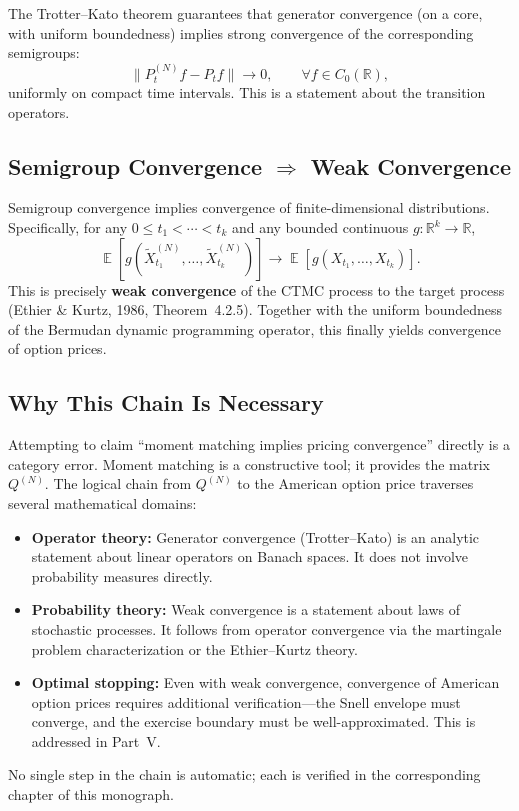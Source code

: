 \documentclass[11pt,a4paper,openany]{book}
\theoremstyle{definition}
\theoremstyle{plain}
\theoremstyle{remark}
\DeclareMathOperator{\E}{\mathbb{E}}
\newcommand{\1}{\mathbbm{1}}
\newcommand{\R}{\mathbb{R}}
\begin{document}
The Trotter--Kato theorem guarantees that generator convergence (on a core, with uniform boundedness) implies strong convergence of the corresponding semigroups:
\[
\|P_{t}^{(N)} f - P_{t} f\| \to 0, \qquad \forall f \in C_{0}(\R),
\]
uniformly on compact time intervals. This is a statement about the transition operators.

\subsection{Semigroup Convergence $\Rightarrow$ Weak Convergence}

Semigroup convergence implies convergence of finite-dimensional distributions. Specifically, for any $0 \leq t_{1} < \cdots < t_{k}$ and any bounded continuous $g: \R^{k} \to \R$,
\[
\E[g(\widetilde{X}_{t_{1}}^{(N)}, \ldots, \widetilde{X}_{t_{k}}^{(N)})] \to \E[g(X_{t_{1}}, \ldots, X_{t_{k}})].
\]
This is precisely \textbf{weak convergence} of the CTMC process to the target process (Ethier \& Kurtz, 1986, Theorem~4.2.5). Together with the uniform boundedness of the Bermudan dynamic programming operator, this finally yields convergence of option prices.

\subsection{Why This Chain Is Necessary}

Attempting to claim ``moment matching implies pricing convergence'' directly is a category error. Moment matching is a constructive tool; it provides the matrix $Q^{(N)}$. The logical chain from $Q^{(N)}$ to the American option price traverses several mathematical domains:
\begin{itemize}
    \item \textbf{Operator theory:} Generator convergence (Trotter--Kato) is an analytic statement about linear operators on Banach spaces. It does not involve probability measures directly.
    \item \textbf{Probability theory:} Weak convergence is a statement about laws of stochastic processes. It follows from operator convergence via the martingale problem characterization or the Ethier--Kurtz theory.
    \item \textbf{Optimal stopping:} Even with weak convergence, convergence of American option prices requires additional verification---the Snell envelope must converge, and the exercise boundary must be well-approximated. This is addressed in Part~V.
\end{itemize}
No single step in the chain is automatic; each is verified in the corresponding chapter of this monograph.
\end{document}
